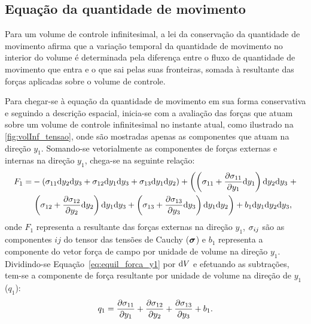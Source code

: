 \subsection{Equação da quantidade de movimento}

Para um volume de controle infinitesimal, a lei da conservação da quantidade de movimento afirma que a variação temporal da quantidade de movimento no interior do volume é determinada pela diferença entre o fluxo de quantidade de movimento que entra e o que sai pelas suas fronteiras, somada à resultante das forças aplicadas sobre o volume de controle.

Para chegar-se à equação da quantidade de movimento em sua forma conservativa e seguindo a descrição espacial, inicia-se com a avaliação das forças que atuam sobre um volume de controle infinitesimal no instante atual, como ilustrado na \autoref{fig:volInf_tensao}, onde são mostradas apenas as componentes que atuam na direção $y_1$. Somando-se vetorialmente as componentes de forças externas e internas na direção $y_1$, chega-se na seguinte relação:
\begin{align}
	\begin{split}
	F_1 =& -\left(\sigma_{11}\mathrm{d} y_2 \mathrm{d} y_3 + \sigma_{12}\mathrm{d} y_1 \mathrm{d} y_3 + \sigma_{13}\mathrm{d} y_1 \mathrm{d} y_2\right) + \left(\left(\sigma_{11} + \frac{\partial \sigma_{11}}{\partial y_1}\mathrm{d} y_1 \right)\mathrm{d} y_2 \mathrm{d} y_3 \right. + \\ & \left. \left(\sigma_{12}+ \frac{\partial \sigma_{12}}{\partial y_2}\mathrm{d} y_2\right)\mathrm{d} y_1 \mathrm{d} y_3 + \left(\sigma_{13}+ \frac{\partial \sigma_{13}}{\partial y_3}\mathrm{d} y_3\right)\mathrm{d} y_1 \mathrm{d} y_2\right) + b_{1}\mathrm{d} y_1 \mathrm{d} y_2 \mathrm{d} y_3, \label{eq:equil_forca_y1} 
	\end{split}
\end{align}	
\noindent onde $F_1$ representa a resultante das forças externas na direção $y_1$, $\sigma_{ij}$ são as componentes $ij$ do tensor das tensões de Cauchy ($\boldsymbol{\sigma}$) e $b_1$ representa a componente do vetor força de campo por unidade de volume na direção $y_1$. Dividindo-se Equação~\eqref{eq:equil_forca_y1} por $\mathrm{d} V$ e efetuando as subtrações, tem-se a componente de força resultante por unidade de volume na direção de $y_1$ ($q_1$):
\begin{align}
		q_1 =\frac{\partial \sigma_{11}}{\partial y_1} + \frac{\partial \sigma_{12}}{\partial y_2} + \frac{\partial \sigma_{13}}{\partial y_3} + b_{1}.
\end{align}	


